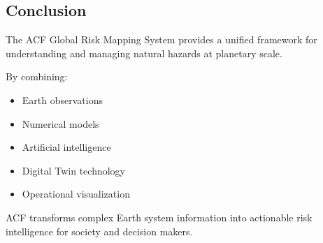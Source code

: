 
\subsection{Conclusion}

The ACF Global Risk Mapping System provides a unified framework for
understanding and managing natural hazards at planetary scale.

By combining:

\begin{itemize}

\item Earth observations

\item Numerical models

\item Artificial intelligence

\item Digital Twin technology

\item Operational visualization

\end{itemize}


ACF transforms complex Earth system information into actionable
risk intelligence for society and decision makers.




